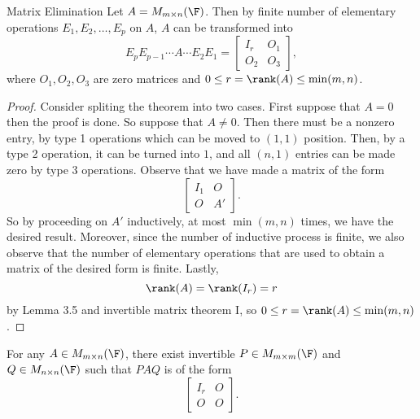 \documentclass[linearalgebra]{subfiles}
\begin{document}
    \begin{theorem}{Matrix Elimination}
            Let $A=M_{m\times n}(\F)$. Then by finite number of elementary operations $E_1, E_2, \ldots, E_p$ on $A$, $A$ can be transformed into
            \begin{equation*}
                E_pE_{p-1}\cdots A\cdots E_2E_1 = \begin{bmatrix} I_r & O_1 \\ O_2 & O_3 \end{bmatrix}, 
            \end{equation*}
            where $O_1, O_2, O_3$ are zero matrices and $0\leq r = \rank(A) \leq \min(m,n)$.
    \end{theorem}

    \begin{proof}
        Consider spliting the theorem into two cases. First suppose that $A=0$ then the proof is done. So suppose that $A\neq 0$. Then there must be a nonzero entry, by type 1 operations which can be moved to $(1,1)$ position. Then, by a type 2 operation, it can be turned into $1$, and all $(n,1)$ entries can be made zero by type 3 operations. Observe that we have made a matrix of the form
        \begin{equation*}
            \begin{bmatrix} I_1 & O \\ O & A' \end{bmatrix}.
        \end{equation*}
        So by proceeding on $A'$ inductively, at most $\min(m, n)$ times, we have the desired result. Moreover, since the number of inductive process is finite, we also observe that the number of elementary operations that are used to obtain a matrix of the desired form is finite. Lastly,
        \begin{equation*}
            \rank(A) = \rank(I_r) = r 
        \end{equation*}
        by Lemma 3.5 and invertible matrix theorem I, so $0\leq r = \rank(A) \leq \min(m, n)$.
    \end{proof}

    \begin{cor}{}
        For any $A\in M_{m\times n}(\F)$, there exist invertible $P\in M_{m\times m}(\F)$ and $Q\in M_{n\times n}(\F)$ such that $PAQ$ is of the form
        \begin{equation*}
            \begin{bmatrix}
                I_r & O \\ O & O
            \end{bmatrix}.
        \end{equation*}
    \end{cor}	
\end{document}
